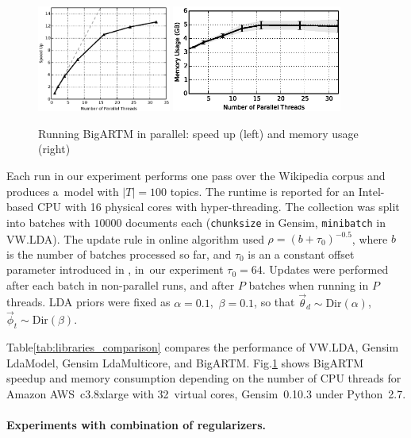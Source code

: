 \documentclass[russian,english]{llncs}
\begin{document}
\begin{figure}[t]
	\centering
	\includegraphics[height=35mm]{bigartm_speedup.eps}
	\includegraphics[height=35mm]{bigartm_memory.eps}
	\caption{Running BigARTM in parallel: speed up (left) and memory usage (right)}
	\label{fig:bigartm_speedup}
\end{figure}

Each run in our experiment performs one pass over the Wikipedia corpus and produces a~model with $|T|=100$ topics.
The runtime is reported for an Intel-based CPU with 16 physical cores with hyper-threading.
The collection was split into batches with $10 000$ documents each
(\texttt{chunksize} in Gensim, \texttt{minibatch} in VW.LDA).
The update rule in online algorithm used
${\rho = (b + \tau_0)^{-0.5}}$,
where $b$ is the number of batches processed so far,
and $\tau_0$ is an a constant offset parameter introduced in \cite{hoffman10online},
in~our experiment ${\tau_0 = 64}$.
Updates were performed after each batch in non-parallel runs, and after $P$ batches when running in $P$ threads.
LDA priors were fixed as
${\alpha = 0.1}$,\, ${\beta = 0.1}$,
so that
${\vec\theta}_d \sim \text{Dir}(\alpha)$,\,
${\vec\phi}_t \sim \text{Dir}(\beta)$.

Table\;\ref{tab:libraries_comparison} compares the performance of
VW.LDA, Gensim LdaModel, Gensim LdaMulticore, and BigARTM.
%
Fig.\;\ref{fig:bigartm_speedup} shows BigARTM speedup and memory consumption depending on the number of CPU threads
for Amazon AWS~c3.8xlarge with 32~virtual cores,
Gensim~\mbox{0.10.3} under Python~\mbox{2.7}.


\paragraph{Experiments with combination of regularizers.}
\end{document}
